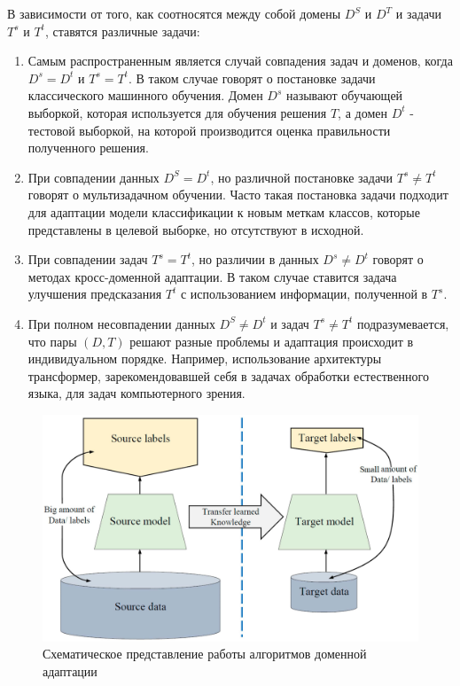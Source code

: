 В зависимости от того, как соотносятся между собой домены $D^S$ и $D^T$ и задачи $T^s$ и $T^t$, ставятся различные задачи:
\begin{enumerate}
\item Самым распространенным является случай совпадения задач и доменов, когда $D^s = D^t$ и $T^s = T^t$. В таком случае говорят о постановке задачи классического машинного обучения. Домен $D^s$ называют обучающей выборкой, которая используется для обучения решения $T$, а домен $D^t$ - тестовой выборкой, на которой производится оценка правильности полученного решения.

\item При совпадении данных $D^S = D^t$, но различной постановке задачи $T^s \ne T^t$ говорят о мультизадачном обучении. Часто такая постановка задачи подходит для адаптации модели классификации к новым меткам классов, которые представлены в целевой выборке, но отсутствуют в исходной.

\item При совпадении задач $T^s = T^t$, но различии в данных $D^s \ne D^t$ говорят о методах кросс-доменной адаптации. В таком случае ставится задача улучшения предсказания $T^t$ с использованием информации, полученной в $T^s$. 

\item При полном несовпадении данных $D^S \ne D^t$ и задач $T^s \ne T^t$ подразумевается, что пары $(D, T)$ решают разные проблемы и адаптация происходит в индивидуальном порядке. Например, использование архитектуры трансформер, зарекомендовавшей себя в задачах обработки естественного языка, для задач компьютерного зрения.
\end{enumerate} 

\begin{figure}[h]
	\centering
	\includegraphics[width=.75\textwidth]{./images/DA.jpg}
	\caption{Схематическое представление работы алгоритмов доменной адаптации}
	\label{fig:DA}
\end{figure}

